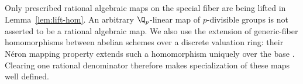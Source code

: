 Only prescribed rational algebraic maps on the special fiber are being
lifted in Lemma~\ref{lem:lift-hom}. An arbitrary \(\Q_p\)-linear map of
\(p\)-divisible groups is not asserted to be a rational algebraic map.
We also use the extension of generic-fiber homomorphisms between abelian
schemes over a discrete valuation ring: their N\'eron mapping property
extends such a homomorphism uniquely over the base
\cite[Definition~5.1 and Example~5.3]{Conrad2003}. Clearing one
rational denominator therefore makes specialization of these maps
well defined.
